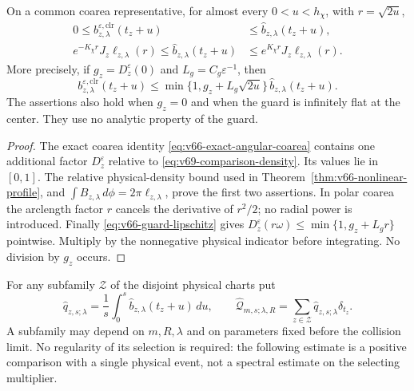 \begin{lemma}
\label{lem:v69-positive-comparison}
On a common coarea representative, for almost every $0<u<h_\chi$,
with $r=\sqrt{2u}$,
\begin{align}
 0\le b_{z,\lambda}^{\varepsilon,\mathrm{clr}}(t_z+u)
       &\le\widehat b_{z,\lambda}(t_z+u),
                                      \label{eq:v69-source-domination}\\
 e^{-K_\chi r}J_z\ell_{z,\lambda}(r)
       \le\widehat b_{z,\lambda}(t_z+u)
       &\le e^{K_\chi r}J_z\ell_{z,\lambda}(r).
                                      \label{eq:v69-unguarded-profile}
\end{align}
More precisely, if $g_z=D_z^\varepsilon(0)$ and
$L_g=C_g\varepsilon^{-1}$, then
\begin{equation}\label{eq:v69-absolute-guard-comparison}
 b_{z,\lambda}^{\varepsilon,\mathrm{clr}}(t_z+u)
 \le \min\{1,g_z+L_g\sqrt{2u}\}\,
                    \widehat b_{z,\lambda}(t_z+u).
\end{equation}
The assertions also hold when $g_z=0$ and when the guard is infinitely
flat at the center. They use no analytic property of the guard.
\end{lemma}
\begin{proof}
The exact coarea identity \eqref{eq:v66-exact-angular-coarea} contains
one additional factor $D_z^\varepsilon$ relative to
\eqref{eq:v69-comparison-density}. Its values lie in $[0,1]$.
The relative physical-density bound used in
Theorem~\ref{thm:v66-nonlinear-profile}, and
$\int B_{z,\lambda}\,d\phi=2\pi\ell_{z,\lambda}$, prove the first
two assertions. In polar coarea the arclength factor $r$ cancels the
derivative of $r^2/2$; no radial power is introduced. Finally
\eqref{eq:v66-guard-lipschitz} gives
$D_z^\varepsilon(r\omega)\le\min\{1,g_z+L_gr\}$ pointwise.
Multiply by the nonnegative physical indicator before integrating.
No division by $g_z$ occurs.
\end{proof}

For any subfamily $\mathcal Z$ of the disjoint physical charts put
\begin{equation}\label{eq:v69-comparison-trace}
 \widehat q_{z,s;\lambda}=\frac1s\int_0^s
                       \widehat b_{z,\lambda}(t_z+u)\,du,
 \qquad
 \widehat{\mathcal Q}_{m,s;\lambda,R}
        =\sum_{z\in\mathcal Z}\widehat q_{z,s;\lambda}\delta_{t_z}.
\end{equation}
A subfamily may depend on $m,R,\lambda$ and on parameters fixed before
the collision limit. No regularity of its selection is required: the
following estimate is a positive comparison with a single physical
event, not a spectral estimate on the selecting multiplier.

